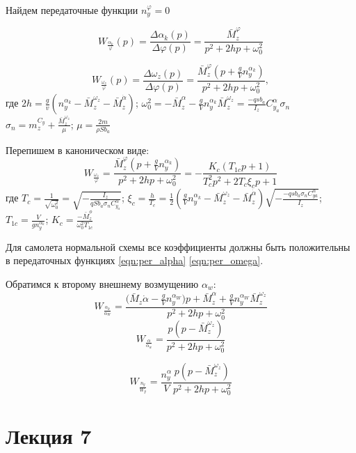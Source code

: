 \documentclass{article}
\begin{document}
Найдем передаточные функции $n_y^\varphi = 0$

\begin{equation}\label{eqn:per_alpha}
	W_{\frac{\alpha_k}{\varphi}}(p) = \frac{\Delta \alpha_k(p)}{\Delta
		\varphi(p)} = \frac{\bar{M}_z^\varphi}{p^2 + 2hp + \omega_0^2}
\end{equation}

\[
	W_{\frac{\omega_z}{\varphi}} (p) = \frac{\Delta \omega_z(p)}{\Delta
		\varphi(p)} =\frac{\bar{M}_z^\varphi(p + \frac{g}{V} n_y^{\alpha_k})}{p^2 +
		2hp + \omega_0^{2}},
\]
где $2h = \frac{g}{v}(n_y^{\alpha_k} - \bar{M}_z^{\omega_z} -
	\bar{M}_z^{\dot{\alpha}})$; $\omega_0^2 = - \bar{M}_z^{\alpha} - \frac{g}{V}
	n_y^{\alpha_k} \bar{M}_z^{\omega_z} = \frac{-qsb_a}{I_z} C_{y_a}^{\alpha}
	\sigma_{n}$\\
$\sigma_n = m_z^{C_y} + \frac{\bar{M}_z^{\omega_z}}{\mu}$; $\mu = \frac{2
		m}{\rho S b_a}$

Перепишем в каноническом виде:
\begin{equation}\label{eqn:per_omega}
	W_{\frac{\omega_z}{\varphi}} = \frac{\bar{M}_z^\varphi(p + \frac{g}{V}
		n_y^{\alpha_k})} {p^2 + 2hp + \omega_0^2}= %
	-\frac{K_c (T_{1c} p + 1)}{T^2_c p^2 + 2 T_c \xi_c p + 1}
\end{equation}
где $T_c = \frac{1}{\sqrt{\omega_0^2}} = \sqrt{-\frac{I_z}{q S b _a \sigma_n
			C_{y_a}^{\alpha}}}$; $\xi_c = \frac{h}{T_c} = \frac{1}{2}( \frac{g}{V}
	n_y^{\alpha_k} - \bar{M}_z^{\omega_z} - \bar{M}_z^{\dot{\alpha}})
	\sqrt{-\frac{-q s b_a \sigma_n C_{ya}^{\alpha}}{I_z}}$; $T_{1c} = \frac{V}{g
	n_y^{\alpha_k}}$; $K_c = \frac{-\bar{M}_z^\phi}{\omega_0^2 T_{1c}}$

Для самолета нормальной схемы все коэффициенты должны быть положительны в
передаточных функциях \eqref{eqn:per_alpha} \eqref{eqn:per_omega}.

Обратимся к второму внешнему возмущению $\alpha_w$:
\[
	W_{\frac{\alpha_k}{\alpha_W}} = \frac{(\bar{M}_z {\dot{\alpha} -
	\frac{g}{V} n_y^{\alpha_W}) p + \bar{M}_z^\alpha + \frac{g}{V}
	n_y^{\alpha_W} \bar{M}_z^{\omega_z} }}{p^2 + 2hp + \omega_0^2}
\]
\[
	W_{\frac{\alpha}{\alpha_w}} = \frac{p(p - \bar{M}_z^{\omega_z})}{p^2 + 2hp+
	\omega_0^2}
\]

\[
	W_{\frac{n_y}{W_y}} = \frac{n_y^\alpha}{V} \frac{p(p -
	\bar{M}_z^{\omega_z})}{p^2 + 2hp + \omega_0^2}
\]
\newpage

\section{Лекция 7}
\end{document}
